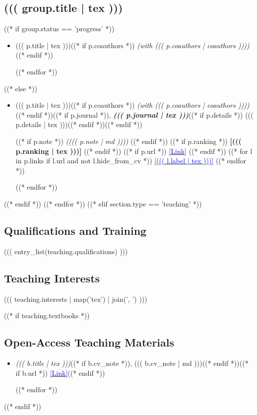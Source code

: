 \documentclass[a4paper,10pt]{article}
\newcommand{\paren}[1]{(#1)}
\newcommand{\cvlink}[2]{\href{#1}{{\footnotesize\textcolor{blue}{[#2]}}}}
\begin{document}
\subsection*{((( group.title | tex )))}
((* if group.status == 'progress' *))
\begin{itemize}[itemsep=0.1em, topsep=2pt]
((* for p in group.papers *))
    \item ((( p.title | tex )))((* if p.coauthors *)) \textit{\paren{with ((( p.coauthors | coauthors )))}}((* endif *))

((* endfor *))
\end{itemize}
((* else *))
\begin{itemize}
((* for p in group.papers *))
    \item ((( p.title | tex )))((* if p.coauthors *)) \textit{\paren{with ((( p.coauthors | coauthors )))}}((* endif *))((* if p.journal *)),
    \textbf{\textit{((( p.journal | tex )))}}((* if p.details *)) ((( p.details | tex )))((* endif *))((* endif *))

((* if p.note *))
    \textit{\paren{((( p.note | md )))}}
((* endif *))
((* if p.ranking *))
    {\footnotesize\textcolor{rankteal}{\textbf{[((( p.ranking | tex )))]}}}
((* endif *))
((* if p.url *))
    \cvlink{((( p.url | url )))}{Link}
((* endif *))
((* for l in p.links if l.url and not l.hide_from_cv *))
    \cvlink{((( l.url | url )))}{((( l.label | tex )))}
((* endfor *))

((* endfor *))
\end{itemize}
((* endif *))
((* endfor *))
((* elif section.type == 'teaching' *))

\subsection*{Qualifications and Training}
((( entry_list(teaching.qualifications) )))

\subsection*{Teaching Interests}
((( teaching.interests | map('tex') | join(', ') )))

((* if teaching.textbooks *))
\subsection*{Open-Access Teaching Materials}
\begin{itemize}
((* for b in teaching.textbooks *))
    \item \textit{((( b.title | tex )))}((* if b.cv_note *)), ((( b.cv_note | md )))((* endif *))((* if b.url *)) \cvlink{((( b.url | url )))}{Link}((* endif *))

((* endfor *))
\end{itemize}
((* endif *))
\end{document}
